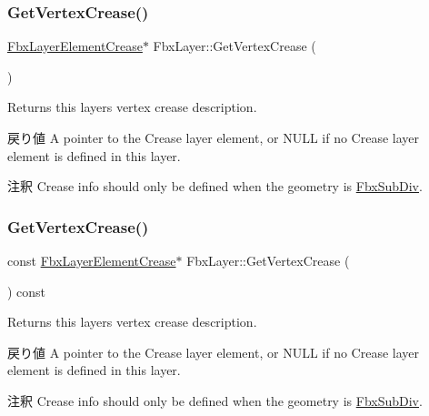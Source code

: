 \subsubsection{\texorpdfstring{Get\+Vertex\+Crease()}{GetVertexCrease()}\hspace{0.1cm}{\footnotesize\ttfamily [1/2]}}
{\footnotesize\ttfamily \hyperlink{class_fbx_layer_element_crease}{Fbx\+Layer\+Element\+Crease}$\ast$ Fbx\+Layer\+::\+Get\+Vertex\+Crease (\begin{DoxyParamCaption}{ }\end{DoxyParamCaption})}

Returns this layer\textquotesingle{}s vertex crease description. \begin{DoxyReturn}{戻り値}
A pointer to the Crease layer element, or {\ttfamily N\+U\+LL} if no Crease layer element is defined in this layer. 
\end{DoxyReturn}
\begin{DoxyRemark}{注釈}
Crease info should only be defined when the geometry is \hyperlink{class_fbx_sub_div}{Fbx\+Sub\+Div}. 
\end{DoxyRemark}
\mbox{\label{class_fbx_layer_a452a6eae29e57f1fadfa6ca218dc3e03}} 
\subsubsection{\texorpdfstring{Get\+Vertex\+Crease()}{GetVertexCrease()}\hspace{0.1cm}{\footnotesize\ttfamily [2/2]}}
{\footnotesize\ttfamily const \hyperlink{class_fbx_layer_element_crease}{Fbx\+Layer\+Element\+Crease}$\ast$ Fbx\+Layer\+::\+Get\+Vertex\+Crease (\begin{DoxyParamCaption}{ }\end{DoxyParamCaption}) const}

Returns this layer\textquotesingle{}s vertex crease description. \begin{DoxyReturn}{戻り値}
A pointer to the Crease layer element, or {\ttfamily N\+U\+LL} if no Crease layer element is defined in this layer. 
\end{DoxyReturn}
\begin{DoxyRemark}{注釈}
Crease info should only be defined when the geometry is \hyperlink{class_fbx_sub_div}{Fbx\+Sub\+Div}. 
\end{DoxyRemark}
\mbox{\label{class_fbx_layer_a3e2723477c9dab8c3c9abddcb4e1abf5}} 

